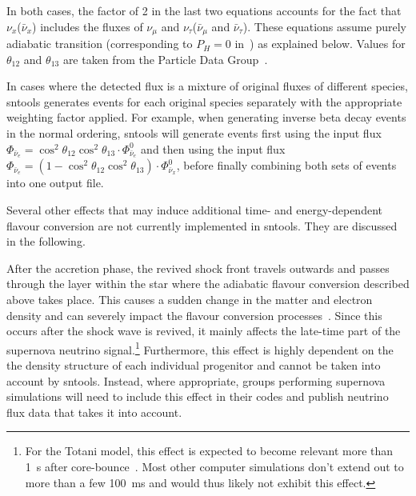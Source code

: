 \documentclass[11pt, oneside]{article}
\newcommand{\numu}{\ensuremath{\nu_\mu}\xspace}
\newcommand{\nutau}{\ensuremath{\nu_\tau}\xspace}
\newcommand{\nux}{\ensuremath{\nu_x}\xspace}
\newcommand{\nuebar}{\ensuremath{\bar{\nu}_e}\xspace}
\newcommand{\numubar}{\ensuremath{\bar{\nu}_\mu}\xspace}
\newcommand{\nutaubar}{\ensuremath{\bar{\nu}_\tau}\xspace}
\newcommand{\nuxbar}{\ensuremath{\bar{\nu}_x}\xspace}
\begin{document}
In both cases, the factor of 2 in the last two equations accounts for the fact that \nux (\nuxbar) includes the fluxes of \numu and \nutau (\numubar and \nutaubar).
These equations assume purely adiabatic transition (corresponding to $P_H = 0$ in~\cite{Dighe2000,Fogli2005}) as explained below.
Values for $\theta_{12}$ and $\theta_{13}$ are taken from the Particle Data Group~\cite{PDG2018}.

In cases where the detected flux is a mixture of original fluxes of different species, sntools generates events for each original species separately with the appropriate weighting factor applied.
For example, when generating inverse beta decay events in the normal ordering, sntools will generate events first using the input flux $\Phi_{\nuebar} = \cos^2 \theta_{12} \cos^2 \theta_{13} \cdot \Phi^0_{\nuebar}$ and then using the input flux $\Phi_{\nuebar} = (1 - \cos^2 \theta_{12} \cos^2 \theta_{13}) \cdot \Phi^0_{\nuxbar}$, before finally combining both sets of events into one output file.

Several other effects that may induce additional time- and energy-dependent flavour conversion are not currently implemented in sntools.
They are discussed in the following.

After the accretion phase, the revived shock front travels outwards and passes through the layer within the star where the adiabatic flavour conversion described above takes place.
This causes a sudden change in the matter and electron density and can severely impact the flavour conversion processes~\cite{Schirato2002}.
Since this occurs after the shock wave is revived, it mainly affects the late-time part of the supernova neutrino signal.\footnote{For the Totani model, this effect is expected to become relevant more than \SI{1}{s} after core-bounce~\cite{Fogli2005}. Most other computer simulations don’t extend out to more than a few \SI{100}{ms} and would thus likely not exhibit this effect.}
Furthermore, this effect is highly dependent on the the density structure of each individual progenitor and cannot be taken into account by sntools.
Instead, where appropriate, groups performing supernova simulations will need to include this effect in their codes and publish neutrino flux data that takes it into account.
\end{document}
